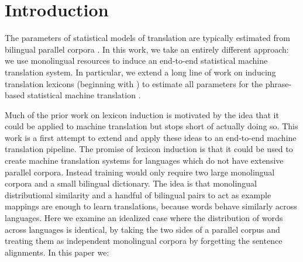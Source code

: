 \documentclass[11pt]{article}
\newcommand{\mnote}[1]{\marginpar{%
  \vskip-\baselineskip
  \raggedright\footnotesize
  \itshape\hrule\smallskip\tiny{#1}\par\smallskip\hrule}}
\newcommand{\mtodo}[1]{\mnote{\textcolor{red}{#1}}}
\begin{document}
\begin{abstract}
\end{abstract}


\section{Introduction} \label{sect:intro}

The parameters of statistical models of translation are typically estimated from bilingual parallel corpora \cite{Brown:1993}. 
In this work, we take an entirely different approach: we use monolingual resources to induce an end-to-end statistical machine translation system.  In particular, we extend a long line of work on inducing translation lexicons (beginning with ) to estimate all parameters for the phrase-based statistical machine translation \cite{Koehn:2003}.

Much of the prior work on lexicon induction is motivated by the idea that it could be applied to machine translation but stops short of actually doing so.  This work is a first attempt to extend and apply these ideas to an end-to-end machine translation pipeline. 
The promise of lexicon induction is that it could be used to create machine translation systems for languages which do not have extensive parallel corpora.  
Instead training would only require two large monolingual corpora and a small bilingual dictionary.
The idea is that monolingual distributional similarity and a handful of bilingual pairs to act as example mappings are enough to learn translations, because words behave similarly across languages.  Here we examine an idealized case where the distribution of words across languages is identical, by taking the two sides of a parallel corpus and treating them as independent monolingual corpora by forgetting the sentence alignments. In this paper we:
\end{document}
